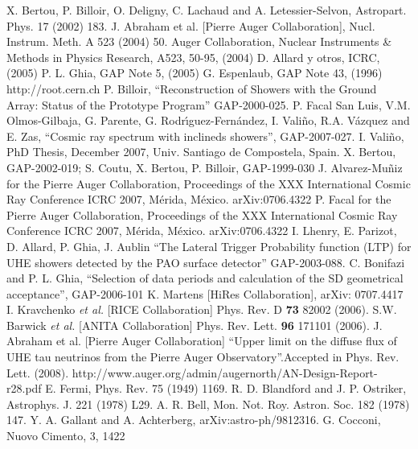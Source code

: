 \begin{thebibliography}{1}
 X. Bertou, P. Billoir, O. Deligny, C. Lachaud and A. Letessier-Selvon, Astropart. Phys. 17 (2002) 183.
 J. Abraham et al. [Pierre Auger Collaboration], Nucl. Instrum. Meth. A 523 (2004) 50.
 Auger Collaboration, Nuclear Instruments \& Methods in Physics Research, A523, 50-95, (2004)
 D. Allard y otros, ICRC, (2005)
 P. L. Ghia, GAP Note 5, (2005)
 G. Espenlaub, GAP Note 43, (1996)
 http://root.cern.ch
 P. Billoir, ``Reconstruction of Showers with the Ground Array: Status of the Prototype Program'' GAP-2000-025.
 P. Facal San Luis, V.M. Olmos-Gilbaja, G. Parente, G. Rodr\'\i guez-Fern\'andez, I. Vali\~no, R.A. V\'azquez and E. Zas, ``Cosmic ray spectrum with inclineds showers'', GAP-2007-027.   
 I. Vali\~no, PhD Thesis, December 2007, Univ. Santiago de Compostela, Spain.
 X. Bertou, GAP-2002-019; S. Coutu, X. Bertou, P. Billoir, GAP-1999-030
 J. Alvarez-Mu\~niz for the Pierre Auger Collaboration, Proceedings of the XXX International Cosmic Ray Conference ICRC 2007, M\'erida, M\'exico. arXiv:0706.4322
 P. Facal for the Pierre Auger Collaboration, Proceedings of the XXX International Cosmic Ray Conference ICRC 2007, M\'erida, M\'exico. arXiv:0706.4322
 I. Lhenry, E. Parizot, D. Allard, P. Ghia, J. Aublin ``The Lateral Trigger Probability function (LTP) for UHE showers detected by the PAO surface detector'' GAP-2003-088.
 C. Bonifazi and P. L. Ghia, ``Selection of data periods and calculation of the SD geometrical acceptance'', GAP-2006-101
 K. Martens [HiRes Collaboration], arXiv: 0707.4417
 I. Kravchenko {\it et al.} [RICE Collaboration] Phys. Rev. D {\bf 73} 82002 (2006). 
 S.W. Barwick {\it et al.} [ANITA Collaboration] Phys. Rev. Lett. {\bf 96} 171101 (2006).
 J. Abraham et al. [Pierre Auger Collaboration] ``Upper limit on the diffuse flux of UHE tau neutrinos from the Pierre Auger Observatory''.Accepted in Phys. Rev. Lett. (2008).
 http://www.auger.org/admin/augernorth/AN-Design-Report-r28.pdf
 E. Fermi, Phys. Rev. 75 (1949) 1169.
 R. D. Blandford and J. P. Ostriker, Astrophys. J. 221 (1978) L29.
 A. R. Bell, Mon. Not. Roy. Astron. Soc. 182 (1978) 147.
 Y. A. Gallant and A. Achterberg, arXiv:astro-ph/9812316.
 G. Cocconi, Nuovo Cimento, 3, 1422

\end{thebibliography}
